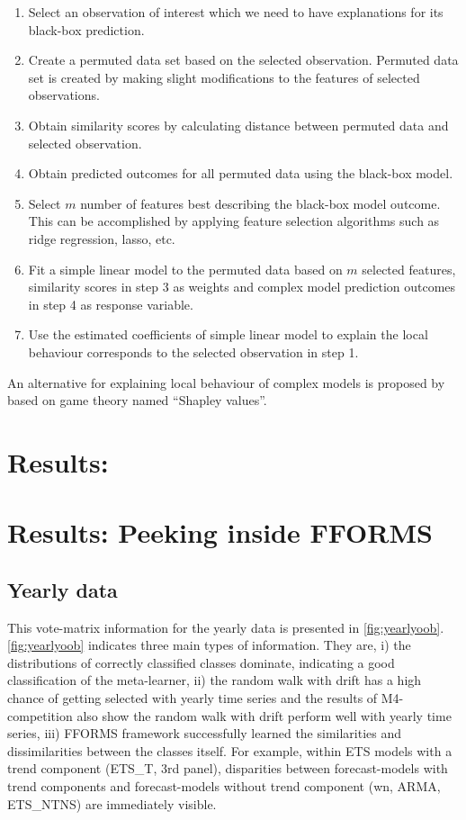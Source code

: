 \documentclass[11pt,a4paper,]{article}
\providecommand{\tightlist}{%
  \setlength{\itemsep}{0pt}\setlength{\parskip}{0pt}}
\begin{document}
\begin{enumerate}
\def\labelenumi{\arabic{enumi}.}
\tightlist
\item
  Select an observation of interest which we need to have explanations
  for its black-box prediction.
\item
  Create a permuted data set based on the selected observation. Permuted
  data set is created by making slight modifications to the features of
  selected observations.
\item
  Obtain similarity scores by calculating distance between permuted data
  and selected observation.
\item
  Obtain predicted outcomes for all permuted data using the black-box
  model.
\item
  Select \(m\) number of features best describing the black-box model
  outcome. This can be accomplished by applying feature selection
  algorithms such as ridge regression, lasso, etc.
\item
  Fit a simple linear model to the permuted data based on \(m\) selected
  features, similarity scores in step 3 as weights and complex model
  prediction outcomes in step 4 as response variable.
\item
  Use the estimated coefficients of simple linear model to explain the
  local behaviour corresponds to the selected observation in step 1.
\end{enumerate}

An alternative for explaining local behaviour of complex models is
proposed by \textcite{lundberg2017unified} based on game theory named
``Shapley values''.

\section{Results:}\label{results}

\clearpage

\section{Results: Peeking inside FFORMS}\label{results2}

\subsection{Yearly data}\label{yearly-data}

This vote-matrix information for the yearly data is presented in
\autoref{fig:yearlyoob}. \autoref{fig:yearlyoob} indicates three main
types of information. They are, i) the distributions of correctly
classified classes dominate, indicating a good classification of the
meta-learner, ii) the random walk with drift has a high chance of
getting selected with yearly time series and the results of
M4-competition also show the random walk with drift perform well with
yearly time series, iii) FFORMS framework successfully learned the
similarities and dissimilarities between the classes itself. For
example, within ETS models with a trend component (ETS\_T, 3rd panel),
disparities between forecast-models with trend components and
forecast-models without trend component (wn, ARMA, ETS\_NTNS) are
immediately visible.
\end{document}
